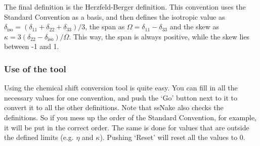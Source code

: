 \documentclass[11pt,a4paper]{article}
\begin{document}
The final definition is the Herzfeld-Berger definition. This convention uses the Standard Convention as a basis, and then defines the isotropic value as $\delta_\text{iso} = (\delta_\text{11} + \delta_\text{22} + \delta_\text{33})/3$, the span as $\Omega = \delta_\text{11} - \delta_\text{33}$ and the skew as $\kappa = 3(\delta_\text{22}-\delta_\text{iso})/\Omega$. This way, the span is always positive, while the skew lies between -1 and 1.



\subsubsection*{Use of the tool}
Using the chemical shift conversion tool is quite easy. You can fill in all the necessary values for one convention, and push the `Go' button next to it to convert it to all the other definitions. Note that ssNake also checks the definitions. So if you mess up the order of the Standard Convention, for example, it will be put in the correct order. The same is done for values that are outside the defined limits (e.g. $\eta$ and $\kappa$). Pushing `Reset' will reset all the values to 0.
\end{document}

